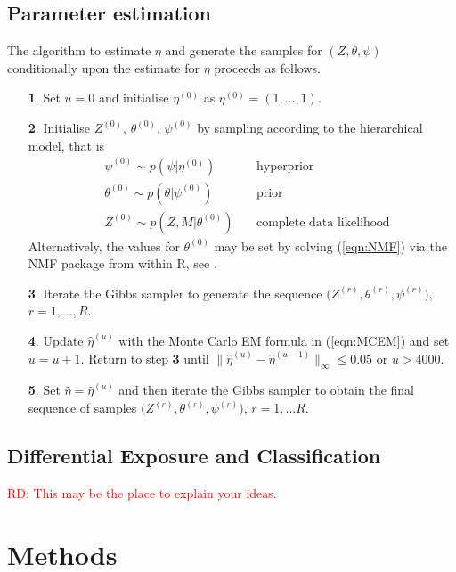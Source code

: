 \documentclass{bioinfo}
\begin{document}
\subsection{Parameter estimation}
The algorithm to estimate $\eta$ and generate the samples for $(Z,
\theta, \psi)$ conditionally upon the estimate for $\eta$ proceeds as 
follows. 
\begin{enumerate}
\item[\textbf{1}.] Set $u = 0$ and initialise $\eta^{(0)}$ as
  $\eta^{(0)} = (1, \ldots, 1)$.
\item[\textbf{2}.] Initialise $Z^{(0)}$, $\theta^{(0)}$, $\psi^{(0)}$
  by sampling according to the hierarchical model, that is
  \begin{align*}
     &\psi^{(0)} \sim p(\psi | \eta^{(0)}) &\ 
        &\text{hyperprior}\\ 
     &\theta^{(0)} \sim p(\theta | \psi^{(0)}) &\ 
        &\text{prior}\\
     &Z^{(0)} \sim p(Z, M|\theta^{(0)}) &\ 
        &\text{complete data likelihood}
  \end{align*}
  Alternatively, the values for $\theta^{(0)}$ may be set by solving 
  (\ref{eqn:NMF}) via the NMF package from within R, see
  \citealp{GS}.
\item[\textbf{3}.] Iterate the Gibbs sampler to generate the sequence
 $\big(Z^{(r)}, \theta^{(r)}, \psi^{(r)}\big)$, $r = 1, \ldots, R$.
\item[\textbf{4}.] Update $\hat\eta^{(u)}$ with the Monte Carlo EM
formula in (\ref{eqn:MCEM}) and set $u = u+1$. Return to step
\textbf{3} until $\big\|\hat\eta^{(u)} - \hat\eta^{(u-1)}\big\|_\infty  
\leqslant 0.05$ or $u > 4000$. 
\item[\textbf{5}.] Set $\hat\eta = \hat\eta^{(u)}$ and then iterate
  the Gibbs sampler to obtain the final sequence of samples
  $\big(Z^{(r)}, \theta^{(r)}, \psi^{(r)}\big)$, $r=1, \ldots
  R$. 
\end{enumerate}

\subsection{Differential Exposure and Classification}
\textcolor{red}{RD: This may be the place to explain your 
ideas.} 


\section{Methods}
\end{document}
